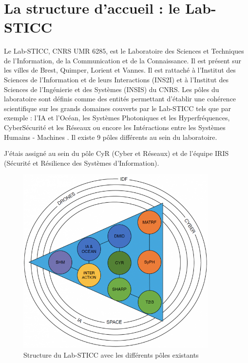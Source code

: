 \section{La structure d'accueil : le Lab-STICC}
        \paragraph*{}
		Le Lab-STICC\cite{labSticc}, CNRS UMR 6285, est le Laboratoire des Sciences et Techniques de l'Information, de la Communication et de la Connaissance. Il est présent sur les villes de Brest, Quimper, Lorient et Vannes. Il est rattaché à l'Institut des Sciences de l'Information et de leurs Interactions (INS2I) et à l'Institut des Sciences de l'Ingénierie et des Systèmes (INSIS) du CNRS.
		Les pôles du laboratoire sont définis comme des entités permettant d’établir une cohérence scientifique sur les grands domaines couverts par le Lab-STICC tels que par exemple : l'IA et l'Océan, les Systèmes Photoniques et les Hyperfréquences, CyberSécurité et les Réseaux ou encore les Intéractions entre les Systèmes Humains - Machines . Il existe 9 pôles différents au sein du laboratoire.
		
		J'étais assigné au sein du pôle CyR  (Cyber et Réseaux) et de l'équipe IRIS (Sécurité et Résilience des Systèmes d'Information).
		
		\begin{figure}[H]
		    \centering
		    \includegraphics[width=10cm]{image/structLabSTICC.png}
		    \caption{Structure du Lab-STICC avec les différents pôles existants}
		    \label{fig:structLabSTICC}
		\end{figure}